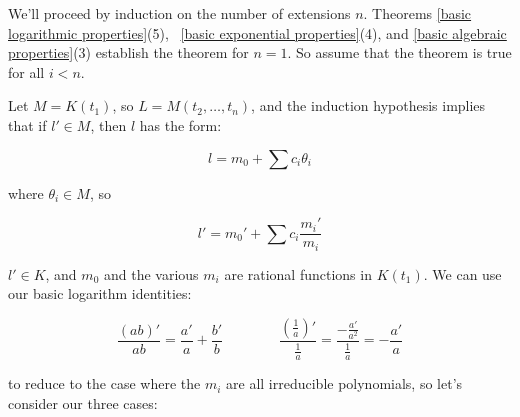We'll proceed by induction on the number of extensions $n$.  Theorems \ref{basic logarithmic properties}(5),
\ \ref{basic exponential properties}(4), and \ref{basic algebraic properties}(3)
establish the theorem for $n=1$.  So assume that the theorem is true
for all $i<n$.

Let $M = K(t_1)$, so $L = M(t_2,\ldots,t_n)$,
and the induction hypothesis implies that if $l' \in M$,
then $l$ has the form:

$$l = m_0 + \sum c_i \theta_i$$

where $\theta_i \in M$, so

$$l' = m_0' + \sum c_i \frac{m_i'}{m_i}$$

$l' \in K$, and $m_0$ and the various $m_i$ are rational
functions in $K(t_1)$.  We can use our basic logarithm identities:

$$\frac{(ab)'}{ab} = \frac{a'}{a} + \frac{b'}{b} \qquad\qquad
\frac{(\frac{1}{a})'}{\frac{1}{a}} = \frac{-\frac{a'}{a^2}}{\frac{1}{a}} = - \frac{a'}{a}$$

to reduce to the case where the $m_i$ are all irreducible
polynomials, so let's consider our three cases:

